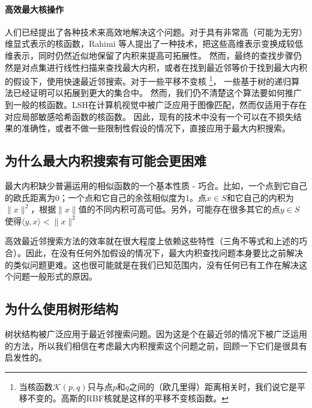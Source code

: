 \documentclass[twocolumn]{article}
\begin{document}
\paragraph{高效最大核操作}人们已经提出了各种技术来高效地解决这个问题。对于具有非常高（可能为无穷）维显式表示的核函数，Rahimi 等人\cite{30}提出了一种技术，把这些高维表示变换成较低维表示，同时仍然近似地保留了内积来提高可拓展性。
然而，最终的查找步骤仍然是对点集进行线性扫描来查找最大内积，或者在找到最近邻等价于找到最大内积的假设下，使用快速最近邻搜索。对于一些平移不变核
\footnote{当核函数$\mathcal{K}(p,q)$只与点$p$和$q$之间的（欧几里得）距离相关时，我们说它是平移不变的。高斯的RBF核就是这样的平移不变核函数。}，
一些基于树的递归算法已经证明可以拓展到更大的集合中\cite{20}。
然而，我们仍不清楚这个算法要如何推广到一般的核函数。LSH在计算机视觉中被广泛应用于图像匹配\cite{23}，然而仅适用于存在对应局部敏感哈希函数的核函数\cite{7}。
因此，现有的技术中没有一个可以在不损失结果的准确性，或者不做一些限制性假设的情况下，直接应用于最大内积搜索。

\subsection{为什么最大内积搜索有可能会更困难}

最大内积缺少普遍运用的相似函数的一个基本性质 - 巧合。比如，一个点到它自己的欧氏距离为0；一个点和它自己的余弦相似度为1。点$x \in S$和它自己的内积为$\|x\|^2$，根据$\|x\|$值的不同内积可高可低。另外，可能存在很多其它的点$y \in S$使得$\langle y,x \rangle < \|x\|^2$

高效最近邻搜索方法的效率就在很大程度上依赖这些特性（三角不等式和上述的巧合）。因此，在没有任何外加假设的情况下，最大内积查找问题本身要比之前解决的类似问题更难。这也很可能就是在我们已知范围内，没有任何已有工作在解决这个问题一般形式的原因。

\subsection{为什么使用树形结构}

树状结构被广泛应用于最近邻搜索问题\cite{13,4,29,8,32}。因为这是个在最近邻的情况下被广泛运用的方法，所以我们相信在考虑最大内积搜索这个问题之前，回顾一下它们是很具有启发性的。
\end{document}

